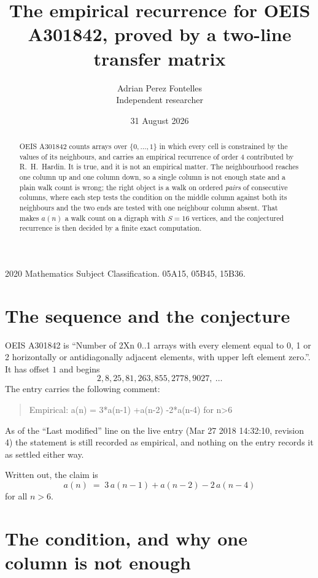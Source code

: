 \documentclass[11pt,a4paper]{article}
\title{The empirical recurrence for OEIS A301842, proved by a two-line transfer matrix}
\author{Adrian Perez Fontelles\\ \small Independent researcher}
\date{31 August 2026}
\theoremstyle{plain}
\theoremstyle{definition}
\begin{document}
\maketitle

\begin{abstract}
OEIS A301842 counts arrays over $\{0,\dots,1\}$ in which every cell is constrained by the
values of its neighbours, and carries an empirical recurrence of order $4$ contributed
by R.~H.~Hardin. It is true, and it is not an empirical matter. The neighbourhood reaches one
column up and one column down, so a single column is not enough state and a plain walk count
is wrong; the right object is a walk on ordered \emph{pairs} of consecutive columns, where
each step tests the condition on the middle column against both its neighbours and the two
ends are tested with one neighbour column absent. That makes $a(n)$ a walk count on a digraph
with $S=16$ vertices, and the conjectured recurrence is then decided by a finite exact
computation.
\end{abstract}

\noindent\small 2020 Mathematics Subject Classification. 05A15, 05B45, 15B36.\normalsize

\section{The sequence and the conjecture}

OEIS A301842 is ``Number of 2Xn 0..1 arrays with every element equal to 0, 1 or 2 horizontally or antidiagonally adjacent elements, with upper left element zero.''. It has offset $1$ and begins
\[
2, 8, 25, 81, 263, 855, 2778, 9027,\ \dots
\]
The entry carries the following comment:
\begin{quote}\small
Empirical: a(n) = 3*a(n-1) +a(n-2) -2*a(n-4) for n>6
\end{quote}
As of the ``Last modified'' line on the live entry (Mar 27 2018 14:32:10, revision 4) the statement is
still recorded as empirical, and nothing on the entry records it as settled either way.

Written out, the claim is
\begin{equation}\label{eq:conj}
a(n)\;=\;3\,a(n-1) + a(n-2) - 2\,a(n-4)
\end{equation}
for all $n>6$.

\section{The condition, and why one column is not enough}
\end{document}
